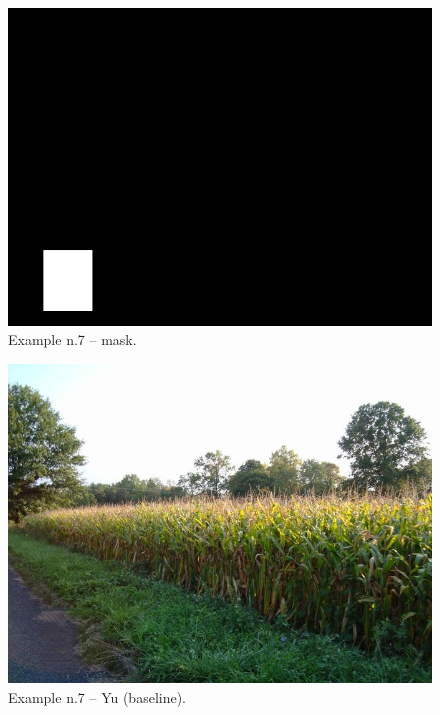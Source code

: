 \documentclass[a4paper, 11pt]{article}
\begin{document}
\begin{figure}
    \centering
    \includegraphics[width=.95\linewidth]{documentation/img/masks/0064_mask.png}
    \caption{Example n.7 -- mask.}
    \label{img:ex_n.7_mask}
\end{figure}
\begin{figure}
    \centering
    \includegraphics[width=.95\linewidth]{documentation/img/baseline/0064.png}
    \caption{Example n.7 -- Yu (baseline).}
    \label{img:ex_n.7_mask}
\end{figure}
\end{document}

